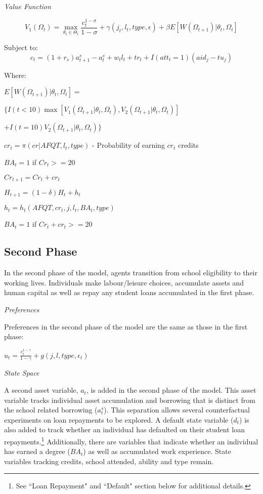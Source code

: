 \documentclass[letterpaper,12pt]{article}
\begin{document}
\noindent \emph{Value Function}

\begin{equation}
V_1(\Omega_t) = \max_{\theta_t \in \Theta_t}  \frac{c_t^{1-\sigma}}{1 - \sigma} + \gamma(j_t, l_t, type, \epsilon) + \beta E[W(\Omega_{t+1})|\theta_t, \Omega_{t}] 
\end{equation}

Subject to:
\begin{equation}
c_t = (1+r_s) a^s_{t+1} - a^s_t +  w_t l_t + tr_t + I(att_t = 1) (aid_j - tu_j)
\end{equation}

Where: 

 $E[W(\Omega_{t+1})|\theta_t, \Omega_{t}] = $

$ \{ I(t<10) \max[V_1(\Omega_{t+1}|\theta_{t}, \Omega_{t}), V_2(\Omega_{t+1}|\theta_{t}, \Omega_{t})] $

$+ I(t=10) V_2(\Omega_{t+1}|\theta_{t}, \Omega_{t}) \}$

$cr_t = \pi(cr|AFQT, l_t, type)$ - Probability of earning $cr_t$ credits

$BA_t = 1$ if $Cr_t >= 20$

$Cr_{t+1} = Cr_t + cr_t$

$H_{t+1} = (1-\delta)H_t + h_t$

$h_t = h_t(AFQT, cr_t, j, l_t, BA_t, type)$

$BA_t = 1$ if $Cr_t + cr_t >= 20$

\subsection{Second Phase}

In the second phase of the model, agents transition from school eligibility to their working lives. Individuals make labour/leisure choices, accumulate assets and human capital as well as repay any student loans accumulated in the first phase. 

\noindent \emph{Preferences}

Preferences in the second phase of the model are the same as those in the first phase:

$u_t = \frac{c_t^{1-\gamma}}{1 - \gamma} + g(j, l, type, \epsilon_t)$

\noindent \emph{State Space}

A second asset variable, $a_t$, is added in the second phase of the model. This asset variable tracks individual asset accumulation and borrowing that is distinct from the school related borrowing ($a_t^s$). This separation allows several counterfactual experiments on loan repayments to be explored. A default state variable ($d_t$) is also added to track whether an individual has defaulted on their student loan repayments.\footnote{See ``Loan Repayment" and ``Default" section below for additional details.} Additionally, there are variables that indicate whether an individual has earned a degree ($BA_t$) as well as accumulated work experience. State variables tracking credits, school attended, ability and type remain. 
\end{document}
